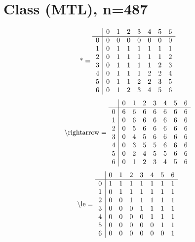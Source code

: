 \documentclass[11pt]{article}
\begin{document}
\section{Class (MTL), n=487}
\[\text{*} = 
\begin{array}{r | r r r r r r r}
 & 0 & 1 & 2 & 3 & 4 & 5 & 6 \\ \hline
0 & 0 & 0 & 0 & 0 & 0 & 0 & 0 \\
1 & 0 & 1 & 1 & 1 & 1 & 1 & 1 \\
2 & 0 & 1 & 1 & 1 & 1 & 1 & 2 \\
3 & 0 & 1 & 1 & 1 & 1 & 2 & 3 \\
4 & 0 & 1 & 1 & 1 & 2 & 2 & 4 \\
5 & 0 & 1 & 1 & 2 & 2 & 3 & 5 \\
6 & 0 & 1 & 2 & 3 & 4 & 5 & 6 \\
\end{array}
\]
\[\text{\textbackslash rightarrow} = 
\begin{array}{r | r r r r r r r}
 & 0 & 1 & 2 & 3 & 4 & 5 & 6 \\ \hline
0 & 6 & 6 & 6 & 6 & 6 & 6 & 6 \\
1 & 0 & 6 & 6 & 6 & 6 & 6 & 6 \\
2 & 0 & 5 & 6 & 6 & 6 & 6 & 6 \\
3 & 0 & 4 & 5 & 6 & 6 & 6 & 6 \\
4 & 0 & 3 & 5 & 5 & 6 & 6 & 6 \\
5 & 0 & 2 & 4 & 5 & 5 & 6 & 6 \\
6 & 0 & 1 & 2 & 3 & 4 & 5 & 6 \\
\end{array}
\]
\[\text{\textbackslash le} = 
\begin{array}{r | r r r r r r r}
 & 0 & 1 & 2 & 3 & 4 & 5 & 6 \\ \hline
0 & 1 & 1 & 1 & 1 & 1 & 1 & 1 \\
1 & 0 & 1 & 1 & 1 & 1 & 1 & 1 \\
2 & 0 & 0 & 1 & 1 & 1 & 1 & 1 \\
3 & 0 & 0 & 0 & 1 & 1 & 1 & 1 \\
4 & 0 & 0 & 0 & 0 & 1 & 1 & 1 \\
5 & 0 & 0 & 0 & 0 & 0 & 1 & 1 \\
6 & 0 & 0 & 0 & 0 & 0 & 0 & 1 \\
\end{array}
\]
\end{document}

